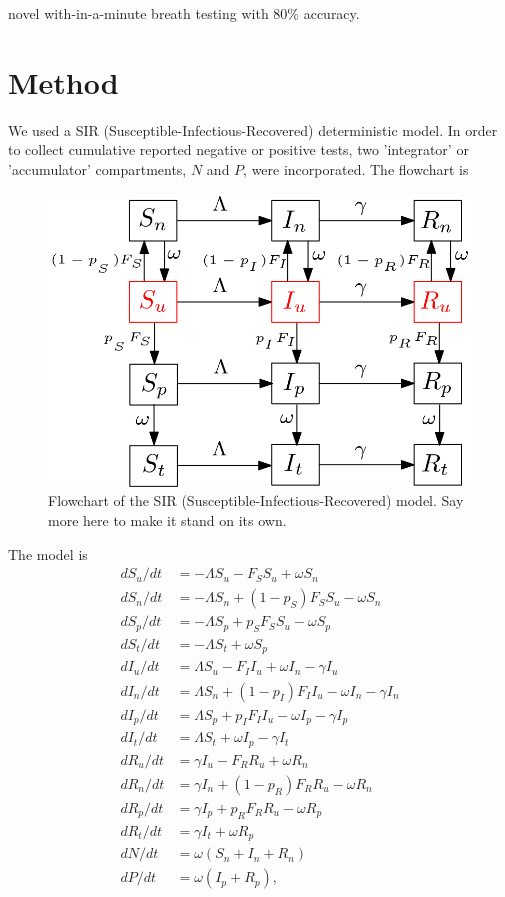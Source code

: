 \documentclass{article}
\begin{document}
\citep{ruszkiewicz2020diagnosis} novel with-in-a-minute breath testing with 80\% accuracy. 

\section{Method}

We used a SIR (Susceptible-Infectious-Recovered) deterministic model. In order to collect cumulative reported negative or positive tests, two 'integrator' or 'accumulator' compartments, $N$ and $P$, were incorporated. The flowchart is 

\begin{figure}[!h] 
\begin{center} 
\includegraphics[scale=0.3]{./pix/sir_comp.png}
\caption{\small Flowchart of the SIR (Susceptible-Infectious-Recovered) model. Say more here to make it stand on its own.
\label{fig:flowchart}} 
\end{center} 
\end{figure}

The model is
\begin{align}
\label{model}
 d S_u/dt &= -\Lambda S_u - F_S S_u + \omega S_n \\
 d S_n/dt &= -\Lambda S_n + (1-p_S) F_S S_u - \omega S_n \\
 d S_p/dt &= -\Lambda S_p + p_S F_S S_u - \omega S_p \\
 d S_t/dt &= -\Lambda S_t + \omega S_p \\
 d I_u/dt &= \Lambda S_u - F_I I_u + \omega I_n  - \gamma I_u  \\
 d I_n/dt &= \Lambda S_n + (1-p_I) F_I I_u - \omega I_n -\gamma I_n \\
 d I_p/dt &= \Lambda S_p + p_I F_I I_u - \omega I_p -\gamma I_p \\
 d I_t/dt &= \Lambda S_t + \omega I_p - \gamma I_t  \\
 d R_u/dt &= \gamma I_u - F_R R_u + \omega R_n \\
 d R_n/dt &= \gamma I_n + (1-p_R) F_R R_u - \omega R_n  \\
 d R_p/dt &= \gamma I_p + p_R F_R R_u  - \omega R_p  \\
 d R_t/dt&= \gamma I_t + \omega R_p  \\
 dN/dt &= \omega (S_n + I_n + R_n)   \\
 dP/dt &= \omega(I_p + R_p),
\end{align}
\end{document}

